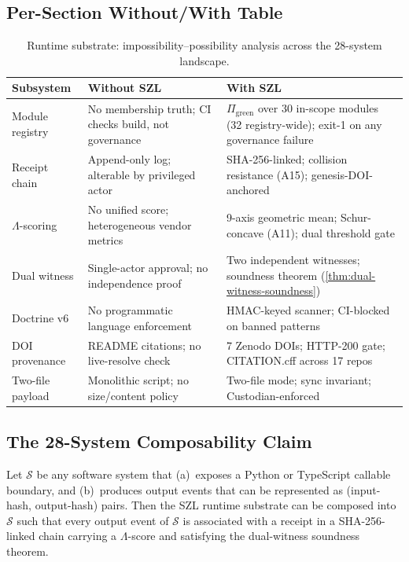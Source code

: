 \subsection{Per-Section Without/With Table}
\label{ssec:runtime-without-with-table}

\begin{table}[ht]
\centering
\small
\begin{tabular}{p{2.5cm}|p{5cm}|p{5cm}}
\textbf{Subsystem} & \textbf{Without SZL} & \textbf{With SZL} \\
\hline
Module registry & No membership truth; CI checks build, not governance & $\Pi_{\mathrm{green}}$ over 30 in-scope modules (32 registry-wide); exit-1 on any governance failure \\
\hline
Receipt chain & Append-only log; alterable by privileged actor & SHA-256-linked; collision resistance (A15); genesis-DOI-anchored \\
\hline
$\Lambda$-scoring & No unified score; heterogeneous vendor metrics & 9-axis geometric mean; Schur-concave (A11); dual threshold gate \\
\hline
Dual witness & Single-actor approval; no independence proof & Two independent witnesses; soundness theorem (\cref{thm:dual-witness-soundness}) \\
\hline
Doctrine v6 & No programmatic language enforcement & HMAC-keyed scanner; CI-blocked on banned patterns \\
\hline
DOI provenance & README citations; no live-resolve check & 7 Zenodo DOIs; HTTP-200 gate; CITATION.cff across 17 repos \\
\hline
Two-file payload & Monolithic script; no size/content policy & Two-file mode; sync invariant; Custodian-enforced \\
\end{tabular}
\caption{Runtime substrate: impossibility--possibility analysis across the
  28-system landscape.}
\label{tab:runtime-frontier}
\end{table}

\subsection{The 28-System Composability Claim}
\label{ssec:28-system-claim}

\begin{theorem}
  \label{thm:universal-composability}
  Let $\mathcal{S}$ be any software system that (a)~exposes a Python or
  TypeScript callable boundary, and (b)~produces output events that can be
  represented as (input-hash, output-hash) pairs.  Then the SZL runtime
  substrate can be composed into $\mathcal{S}$ such that every output event
  of $\mathcal{S}$ is associated with a receipt in a SHA-256-linked chain
  carrying a $\Lambda$-score and satisfying the dual-witness soundness
  theorem.
\end{theorem}

